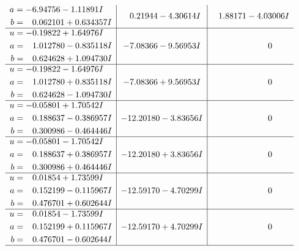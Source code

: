 \documentclass[1p]{elsarticle_modified}
\theoremstyle{definition}
\begin{document}
$$\begin{array}{c|c|c}
\begin{aligned}
a &= -6.94756 - 1.11891 I \\
b &= \phantom{-}0.062101 + 0.634357 I\end{aligned}
 & \phantom{-}0.21944 - 4.30614 I & \phantom{-}1.88171 - 4.03006 I \\ \hline\begin{aligned}
u &= -0.19822 + 1.64976 I \\
a &= \phantom{-}1.012780 - 0.835118 I \\
b &= \phantom{-}0.624628 + 1.094730 I\end{aligned}
 & -7.08366 - 9.56953 I & \phantom{-0.000000 } 0 \\ \hline\begin{aligned}
u &= -0.19822 - 1.64976 I \\
a &= \phantom{-}1.012780 + 0.835118 I \\
b &= \phantom{-}0.624628 - 1.094730 I\end{aligned}
 & -7.08366 + 9.56953 I & \phantom{-0.000000 } 0 \\ \hline\begin{aligned}
u &= -0.05801 + 1.70542 I \\
a &= \phantom{-}0.188637 - 0.386957 I \\
b &= \phantom{-}0.300986 - 0.464446 I\end{aligned}
 & -12.20180 - 3.83656 I & \phantom{-0.000000 } 0 \\ \hline\begin{aligned}
u &= -0.05801 - 1.70542 I \\
a &= \phantom{-}0.188637 + 0.386957 I \\
b &= \phantom{-}0.300986 + 0.464446 I\end{aligned}
 & -12.20180 + 3.83656 I & \phantom{-0.000000 } 0 \\ \hline\begin{aligned}
u &= \phantom{-}0.01854 + 1.73599 I \\
a &= \phantom{-}0.152199 - 0.115967 I \\
b &= \phantom{-}0.476701 + 0.602644 I\end{aligned}
 & -12.59170 - 4.70299 I & \phantom{-0.000000 } 0 \\ \hline\begin{aligned}
u &= \phantom{-}0.01854 - 1.73599 I \\
a &= \phantom{-}0.152199 + 0.115967 I \\
b &= \phantom{-}0.476701 - 0.602644 I\end{aligned}
 & -12.59170 + 4.70299 I & \phantom{-0.000000 } 0\\
 \hline 
 \end{array}$$\newpage\newpage\renewcommand{\arraystretch}{1}
\end{document}
